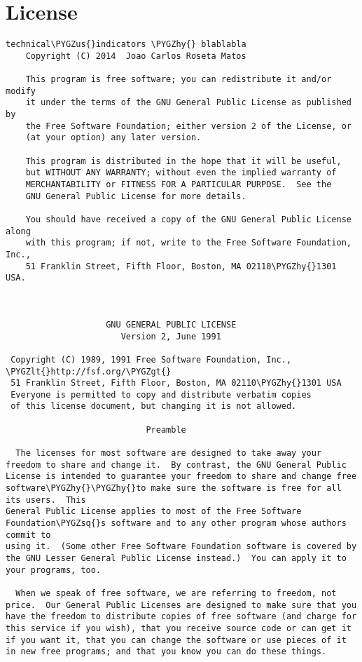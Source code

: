\documentclass[letterpaper,10pt,english]{sphinxmanual}
\def\PYGZus{\char`\_}
\def\PYGZlt{\char`\<}
\def\PYGZgt{\char`\>}
\def\PYGZhy{\char`\-}
\def\PYGZsq{\char`\'}
\begin{document}
\chapter{License}
\label{license::doc}\label{license:license}
\begin{Verbatim}[commandchars=\\\{\}]
    technical\PYGZus{}indicators \PYGZhy{} blablabla
    Copyright (C) 2014  Joao Carlos Roseta Matos

    This program is free software; you can redistribute it and/or modify
    it under the terms of the GNU General Public License as published by
    the Free Software Foundation; either version 2 of the License, or
    (at your option) any later version.

    This program is distributed in the hope that it will be useful,
    but WITHOUT ANY WARRANTY; without even the implied warranty of
    MERCHANTABILITY or FITNESS FOR A PARTICULAR PURPOSE.  See the
    GNU General Public License for more details.

    You should have received a copy of the GNU General Public License along
    with this program; if not, write to the Free Software Foundation, Inc.,
    51 Franklin Street, Fifth Floor, Boston, MA 02110\PYGZhy{}1301 USA.



                    GNU GENERAL PUBLIC LICENSE
                       Version 2, June 1991

 Copyright (C) 1989, 1991 Free Software Foundation, Inc., \PYGZlt{}http://fsf.org/\PYGZgt{}
 51 Franklin Street, Fifth Floor, Boston, MA 02110\PYGZhy{}1301 USA
 Everyone is permitted to copy and distribute verbatim copies
 of this license document, but changing it is not allowed.

                            Preamble

  The licenses for most software are designed to take away your
freedom to share and change it.  By contrast, the GNU General Public
License is intended to guarantee your freedom to share and change free
software\PYGZhy{}\PYGZhy{}to make sure the software is free for all its users.  This
General Public License applies to most of the Free Software
Foundation\PYGZsq{}s software and to any other program whose authors commit to
using it.  (Some other Free Software Foundation software is covered by
the GNU Lesser General Public License instead.)  You can apply it to
your programs, too.

  When we speak of free software, we are referring to freedom, not
price.  Our General Public Licenses are designed to make sure that you
have the freedom to distribute copies of free software (and charge for
this service if you wish), that you receive source code or can get it
if you want it, that you can change the software or use pieces of it
in new free programs; and that you know you can do these things.


\end{Verbatim}
\end{document}
